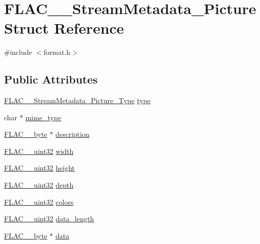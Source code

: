 \hypertarget{struct_f_l_a_c_____stream_metadata___picture}{}\section{F\+L\+A\+C\+\_\+\+\_\+\+Stream\+Metadata\+\_\+\+Picture Struct Reference}
\label{struct_f_l_a_c_____stream_metadata___picture}


{\ttfamily \#include $<$format.\+h$>$}

\subsection*{Public Attributes}
\begin{DoxyCompactItemize}
\item 
\mbox{\hyperlink{group__flac__format_gaf6d3e836cee023e0b8d897f1fdc9825d}{F\+L\+A\+C\+\_\+\+\_\+\+Stream\+Metadata\+\_\+\+Picture\+\_\+\+Type}} \mbox{\hyperlink{struct_f_l_a_c_____stream_metadata___picture_addc05a87a1da1ec7dd2301944ff2819c}{type}}
\item 
char $\ast$ \mbox{\hyperlink{struct_f_l_a_c_____stream_metadata___picture_a9b4af2e10b627c0e79abf4cdd79f80e0}{mime\+\_\+type}}
\item 
\mbox{\hyperlink{ordinals_8h_a5eb569b12d5b047cdacada4d57924ee3}{F\+L\+A\+C\+\_\+\+\_\+byte}} $\ast$ \mbox{\hyperlink{struct_f_l_a_c_____stream_metadata___picture_a5bbfb168b265edfb0b29cfdb71fb413c}{description}}
\item 
\mbox{\hyperlink{ordinals_8h_a9c4005ea7ef8d564b0cc993cdd0e4e5e}{F\+L\+A\+C\+\_\+\+\_\+uint32}} \mbox{\hyperlink{struct_f_l_a_c_____stream_metadata___picture_a18dc6cdef9fa6c815450671f631a1e04}{width}}
\item 
\mbox{\hyperlink{ordinals_8h_a9c4005ea7ef8d564b0cc993cdd0e4e5e}{F\+L\+A\+C\+\_\+\+\_\+uint32}} \mbox{\hyperlink{struct_f_l_a_c_____stream_metadata___picture_a76dbd1212d330807cda289660f5ee754}{height}}
\item 
\mbox{\hyperlink{ordinals_8h_a9c4005ea7ef8d564b0cc993cdd0e4e5e}{F\+L\+A\+C\+\_\+\+\_\+uint32}} \mbox{\hyperlink{struct_f_l_a_c_____stream_metadata___picture_a0f2092ddf28a6803e9c8adb7328c1967}{depth}}
\item 
\mbox{\hyperlink{ordinals_8h_a9c4005ea7ef8d564b0cc993cdd0e4e5e}{F\+L\+A\+C\+\_\+\+\_\+uint32}} \mbox{\hyperlink{struct_f_l_a_c_____stream_metadata___picture_af17c1738bab67eba049ee101acfd36f0}{colors}}
\item 
\mbox{\hyperlink{ordinals_8h_a9c4005ea7ef8d564b0cc993cdd0e4e5e}{F\+L\+A\+C\+\_\+\+\_\+uint32}} \mbox{\hyperlink{struct_f_l_a_c_____stream_metadata___picture_acb893f63a196f70263468770a90580a4}{data\+\_\+length}}
\item 
\mbox{\hyperlink{ordinals_8h_a5eb569b12d5b047cdacada4d57924ee3}{F\+L\+A\+C\+\_\+\+\_\+byte}} $\ast$ \mbox{\hyperlink{struct_f_l_a_c_____stream_metadata___picture_a9c71b5d77920e6d3aee6893795c43605}{data}}
\end{DoxyCompactItemize}


